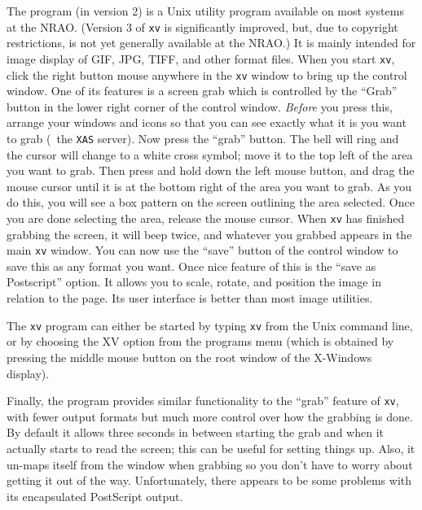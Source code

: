      The {\tt {}} program (in version 2) is a Unix utility
program available on most systems at the \hbox{NRAO}.  (Version 3 of
{\tt xv} is significantly improved, but, due to copyright
restrictions, is not yet generally available at the \hbox{NRAO}.)  It
is mainly intended for image display of GIF, JPG, TIFF, and other
format files.  When you start {\tt xv}, click the right button mouse
anywhere in the {\tt xv} window to bring up the control window.  One
of its features is a screen grab which is controlled by the ``Grab''
button in the lower right corner of the control window.  {\it Before}
you press this, arrange your windows and icons so that you can see
exactly what it is you want to grab (\eg\ the {\tt XAS} server).  Now
press the ``grab'' button.  The bell will ring and the cursor will
change to a white cross symbol; move it to the top left of the area
you want to grab. Then press and hold down the left mouse button, and
drag the mouse cursor until it is at the bottom right of the area you
want to grab. As you do this, you will see a box pattern on the screen
outlining the area selected.  Once you are done selecting the area,
release the mouse cursor.  When {\tt xv} has finished grabbing the
screen, it will beep twice, and whatever you grabbed appears in the
main {\tt xv} window.  You can now use the ``save'' button of the
control window to save this as any format you want.  Once nice feature
of this is the ``save as Postscript'' option.  It allows you to scale,
rotate, and position the image in relation to the page.  Its user
interface is better than most image utilities.

     The {\tt xv} program can either be started by typing {\tt xv}
from the Unix command line, or by choosing the XV option from the
programs menu (which is obtained by pressing the middle mouse button
on the root window of the X-Windows display).

     Finally, the {\tt {}} program provides similar
functionality to the ``grab'' feature of {\tt xv}, with fewer output
formats but much more control over how the grabbing is done.  By
default it allows three seconds in between starting the grab and when
it actually starts to read the screen; this can be useful for setting
things up.  Also, it un-maps itself from the window when grabbing so
you don't have to worry about getting it out of the way.
Unfortunately, there appears to be some problems with its encapsulated
PostScript output.


